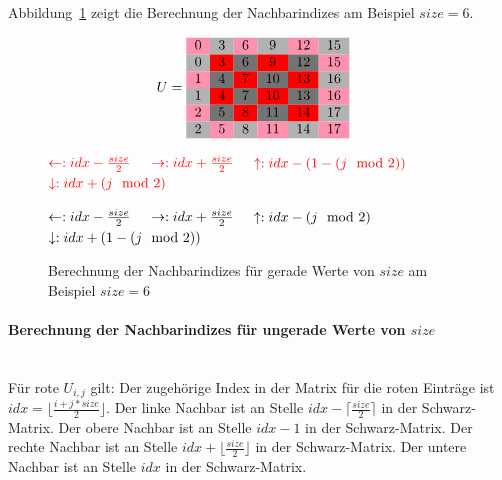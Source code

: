 \documentclass{article}
\begin{document}
Abbildung~\ref{fig:matrix:even} zeigt die Berechnung der Nachbarindizes am Beispiel $size=6$.

\begin{figure}[h!]
\centering
$$U = 
\begin{tabular}{cccccc}
  \cellcolor{rose}0 & \cellcolor[gray]{0.7}3 & \cellcolor{rose}6 & \cellcolor[gray]{0.7}9 & \cellcolor{rose}12 & \cellcolor[gray]{0.7}15\\
  
 \cellcolor[gray]{0.7}0 & \cellcolor{red}3 & \cellcolor[gray]{0.45}6 & \cellcolor{red}9 & \cellcolor[gray]{0.45}12 & \cellcolor{rose}15\\
 
  \cellcolor{rose}1 & \cellcolor[gray]{0.45}4 & \cellcolor{red}7 & \cellcolor[gray]{0.45}10 & \cellcolor{red}13 & \cellcolor[gray]{0.7}16\\
  
 \cellcolor[gray]{0.7}1 & \cellcolor{red}4 & \cellcolor[gray]{0.45}7 & \cellcolor{red}10 & \cellcolor[gray]{0.45}13 & \cellcolor{rose}16 \\
 
 \cellcolor{rose}2 & \cellcolor[gray]{0.45}5 & \cellcolor{red}8 & \cellcolor[gray]{0.45}11 & \cellcolor{red}14 & \cellcolor[gray]{0.7}17\\
 
 \cellcolor[gray]{0.7}2 & \cellcolor{rose}5 & \cellcolor[gray]{0.7}8 & \cellcolor{rose}11 & \cellcolor[gray]{0.7}14 & \cellcolor{rose}17\\
\end{tabular} \quad
$$

$\textcolor{red}{\leftarrow: idx - \frac{size}{2}} \quad$
$\textcolor{red}{\rightarrow: idx + \frac{size}{2}} \quad$
$\textcolor{red}{\uparrow: idx - (1-(j \mod 2))} \quad$
$\textcolor{red}{\downarrow: idx + (j \mod 2)} \quad$

$\textcolor{black}{\leftarrow: idx - \frac{size}{2}} \quad$
$\textcolor{black}{\rightarrow: idx + \frac{size}{2}} \quad$
$\textcolor{black}{\uparrow: idx - (j \mod 2)} \quad$
$\textcolor{black}{\downarrow: idx + (1- (j \mod 2))} \quad$

\caption{Berechnung der Nachbarindizes für gerade Werte von $size$ am Beispiel $size=6$}
\label{fig:matrix:even}
\end{figure}

\paragraph{Berechnung der Nachbarindizes für ungerade Werte von $size$}~\\
Für rote $U_{i,j}$ gilt: Der zugehörige Index in der Matrix für die roten Einträge ist $idx = \lfloor\frac{i+j*size}{2}\rfloor$. Der linke Nachbar ist an Stelle $idx - \lceil\frac{size}{2}\rceil$ in der Schwarz-Matrix. Der obere Nachbar ist an Stelle $idx - 1$ in der Schwarz-Matrix. Der rechte Nachbar ist an Stelle $idx + \lfloor\frac{size}{2}\rfloor$ in der Schwarz-Matrix. Der untere Nachbar ist an Stelle $idx$ in der Schwarz-Matrix.
\end{document}
